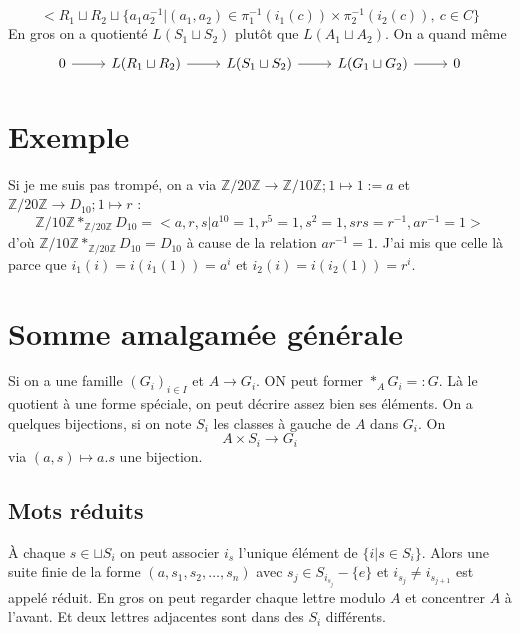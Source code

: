 \documentclass[a4paper,12pt]{book}
\newcommand{\Z}{\mathbb{Z}}
\theoremstyle{plain}
\theoremstyle{definition}
\theoremstyle{remark}
\begin{document}
\[<R_1\sqcup R_2\sqcup \{a_1a_2^{-1}| (a_1,a_2)\in \pi_1^{-1}(i_1(c))\times \pi_2^{-1}(i_2(c)),~c\in C\}\]
En gros on a quotienté $L(S_1\sqcup S_2)$ plutôt que 
$L(A_1\sqcup A_2)$. On a quand même 
\[\begin{tikzcd}
	0 & {L(R_1\sqcup R_2)} & {L(S_1\sqcup S_2)} & {L(G_1\sqcup G_2)} & 0
	\arrow[from=1-1, to=1-2]
	\arrow[from=1-2, to=1-3]
	\arrow[from=1-3, to=1-4]
	\arrow[from=1-4, to=1-5]
\end{tikzcd}\]

\section{Exemple}
Si je me suis pas trompé, on a via 
$\Z/20\Z\to \Z/10\Z;1\mapsto 1:=a$ et
$\Z/20\Z\to D_{10};1\mapsto r$ :
\[\Z/10\Z *_{\Z/20\Z} D_{10}=<a,r,s|a^{10}=1,r^5=1,s^2=1,srs=r^{-1}, ar^{-1}=1>\]
d'où $\Z/10\Z *_{\Z/20\Z} D_{10}=D_{10}$ à cause de la relation
$ar^{-1}=1$. J'ai mis que celle là parce que $i_1(i)=i(i_1(1))=a^i$
et $i_2(i)=i(i_2(1))=r^i$.

\section{Somme amalgamée générale}
Si on a une famille $(G_i)_{i\in I}$ et $A\to G_i$. ON peut former
$*_A G_i=: G$. Là le quotient à une forme spéciale, on peut
décrire assez bien ses éléments. On a quelques bijections, si
on note $S_i$ les classes à gauche de $A$ dans $G_i$. On
\[A\times S_i\to G_i\]
via $(a,s)\mapsto a.s$ une bijection.
\subsection{Mots réduits}
À chaque $s\in \sqcup S_i$ on peut associer $i_s$ l'unique
élément de $\{i|s\in S_i\}$. Alors une suite finie de la forme
$(a,s_1,s_2,\ldots,s_n)$
avec $s_j\in S_{i_{s_j}}-\{e\}$ et $i_{s_j}\ne i_{s_{j+1}}$ est
appelé réduit. En gros on peut regarder chaque lettre modulo $A$
et concentrer $A$ à l'avant. Et deux lettres adjacentes sont dans
des $S_i$ différents.
\end{document}
